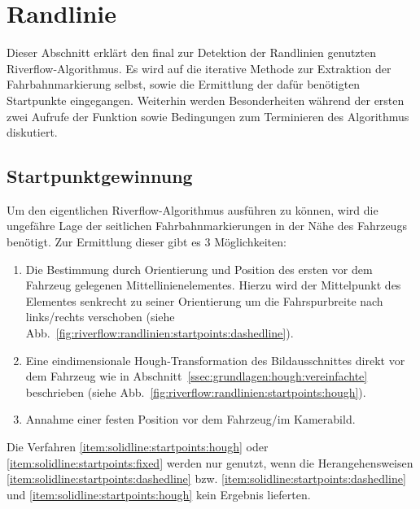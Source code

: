 \section{Randlinie \dcsecondauthorshort} \label{ssec:fahrspurerkennung:riverflow:randlinie}
Dieser Abschnitt erklärt den final zur Detektion der Randlinien genutzten Riverflow-Algorithmus. Es wird auf die iterative Methode zur Extraktion der Fahrbahnmarkierung selbst, sowie die Ermittlung der dafür benötigten Startpunkte eingegangen. Weiterhin werden Besonderheiten während der ersten zwei Aufrufe der Funktion sowie Bedingungen zum Terminieren des Algorithmus diskutiert. 
\subsection{Startpunktgewinnung}
\label{sssec:fahrspurerkennung:riverflow:randlinie:startpunktgewinnung}
Um den eigentlichen Riverflow-Algorithmus ausführen zu können, wird die ungefähre Lage der seitlichen Fahrbahnmarkierungen in der Nähe des Fahrzeugs benötigt. Zur Ermittlung dieser gibt es 3 Möglichkeiten:
\begin{enumerate}
\item \label{item:solidline:startpoints:dashedline}
Die Bestimmung durch Orientierung und Position des ersten vor dem Fahrzeug gelegenen Mittellinienelementes. Hierzu wird der Mittelpunkt des Elementes senkrecht zu seiner Orientierung um die Fahrspurbreite nach links/rechts verschoben (siehe Abb.~\ref{fig:riverflow:randlinien:startpoints:dashedline}).
\item \label{item:solidline:startpoints:hough}
Eine eindimensionale Hough-Transformation des Bildausschnittes direkt vor dem Fahrzeug wie in Abschnitt~\ref{ssec:grundlagen:hough:vereinfachte} beschrieben (siehe Abb.~\ref{fig:riverflow:randlinien:startpoints:hough}). 
\item \label{item:solidline:startpoints:fixed}
Annahme einer festen Position vor dem Fahrzeug/im Kamerabild.
\end{enumerate}

Die Verfahren \ref{item:solidline:startpoints:hough} oder \ref{item:solidline:startpoints:fixed} werden nur genutzt, wenn die Herangehensweisen \ref{item:solidline:startpoints:dashedline} bzw. \ref{item:solidline:startpoints:dashedline} und \ref{item:solidline:startpoints:hough} kein Ergebnis lieferten.

